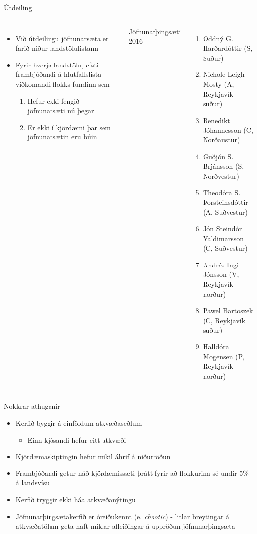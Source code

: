 \documentclass{beamer}
\begin{document}
\begin{frame}{Útdeiling}
    \begin{columns}
        \begin{itemize}
            \item Við útdeilingu jöfnunarsæta er farið niður landstölulistann
            \item Fyrir hverja landstölu, efsti frambjóðandi á hlutfallslista viðkomandi flokks fundinn sem
            \begin{enumerate}
                \item Hefur ekki fengið jöfnunarsæti nú þegar
                \item Er ekki í kjördæmi þar sem jöfnunarsætin eru búin
            \end{enumerate}
        \end{itemize}
        Jöfnunarþingsæti 2016
        \begin{enumerate}
            \tiny
            \item Oddný G. Harðardóttir (S, Suður)
            \item Nichole Leigh Mosty (A, Reykjavík suður)
            \item Benedikt Jóhannesson (C, Norðaustur)
            \item Guðjón S. Brjánsson (S, Norðvestur)
            \item Theodóra S. Þorsteinsdóttir (A, Suðvestur)
            \item Jón Steindór Valdimarsson (C, Suðvestur)
            \item Andrés Ingi Jónsson (V, Reykjavík norður)
            \item Pawel Bartoszek (C, Reykjavík suður)
            \item Halldóra Mogensen (P, Reykjavík norður)       
        \end{enumerate}
    \end{columns}
\end{frame}

\begin{frame}{Nokkrar athuganir}
    \begin{itemize}
        \item Kerfið byggir á einföldum atkvæðaseðlum
        \begin{itemize}
            \item Einn kjósandi hefur eitt atkvæði
        \end{itemize}
        \item Kjördæmaskiptingin hefur mikil áhrif á niðurröðun
        \item Frambjóðandi getur náð kjördæmissæti þrátt fyrir að flokkurinn sé undir 5\% á landsvísu
        \item Kerfið tryggir ekki háa atkvæðanýtingu
        \item Jöfnunarþingsætakerfið er óreiðukennt (e. \emph{chaotic}) - litlar breytingar á atkvæðatölum geta haft miklar afleiðingar á uppröðun jöfnunarþingsæta
    \end{itemize}
\end{frame}
\end{document}
